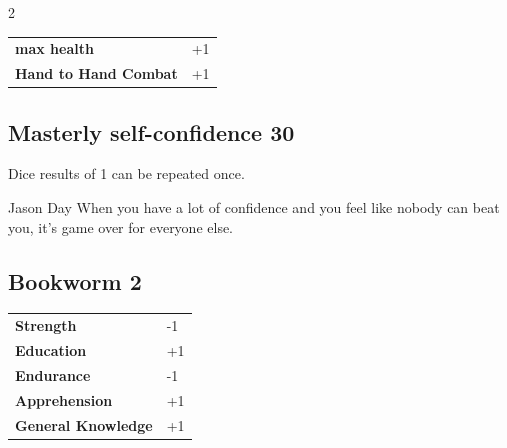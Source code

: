 \begin{multicols}{2}
\begin{tcolorbox}
\begin{tabular}{@{}ll@{}}
    \textbf{max health} & +1\\
    \textbf{Hand to Hand Combat} & +1\\
\end{tabular}


\end{tcolorbox}

\begin{tcolorbox}
    \subsection*{Masterly self-confidence \hfill \small{30 }}
    \tcblower
Dice results of 1 can be repeated once.

\begin{pquote}{Jason Day}
When you have a lot of confidence and you feel like nobody can beat you, it’s game over for everyone else.
\end{pquote}

\vspace{3mm}



\end{tcolorbox}

\begin{tcolorbox}
    \subsection*{Bookworm \hfill \small{2 }}
    \tcblower




\begin{tabular}{@{}ll@{}}
    \textbf{Strength} & -1\\
    \textbf{Education} & +1\\
    \textbf{Endurance} & -1\\
    \textbf{Apprehension} & +1\\
    \textbf{General Knowledge} & +1\\
\end{tabular}



\end{tcolorbox}
\end{multicols}
